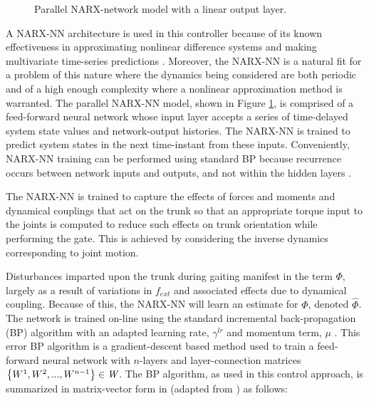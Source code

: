 		\begin{figure}[h!]
			\centering
			\caption{Parallel NARX-network model with a linear output layer.}
			\label{fig::narx_net}
		\end{figure}

		A NARX-NN architecture is used in this controller because of  its known effectiveness in approximating nonlinear difference systems and making multivariate time-series predictions \cite{Tsungnan1996,ChenBillings1990,Hihi1996,Billings2013}. Moreover, the NARX-NN is a natural fit for a problem of this nature where the dynamics being considered are both periodic and of a high enough complexity where a nonlinear approximation method is warranted. The parallel NARX-NN model, shown in Figure \ref{fig::narx_net}, is comprised of a feed-forward neural network whose input layer accepts a series of time-delayed system state values and network-output histories. The NARX-NN is trained to predict system states in the next time-instant from these inputs. Conveniently, NARX-NN training can be performed using standard BP because recurrence occurs between network inputs and outputs, and not within the hidden layers \cite{Nelles2001}.

		The NARX-NN is trained to capture the effects of forces and moments and dynamical couplings that act on the trunk so that an appropriate torque input to the joints is computed to reduce such effects on trunk orientation while performing the gate. This is achieved by considering the inverse dynamics corresponding to joint motion.

		Disturbances imparted upon the trunk during gaiting manifest in the term $\Phi$, largely as a result of variations in $f_{ext}$ and associated effects due to dynamical coupling. Because of this, the NARX-NN will learn an estimate for $\Phi$, denoted $\hat{\Phi}$. The network is trained on-line using the standard incremental back-propagation (BP) algorithm with an adapted learning rate, $\gamma^{lr}$ and momentum term, $\mu$ \cite{Rumelhart1988,Rumelhart1995}. This error BP algorithm is a gradient-descent based method used to train a feed-forward neural network with $n$-layers and layer-connection matrices $\left\{W^{1},W^{2},...,W^{n-1}\right\} \in \emph{W}$. The BP algorithm, as used in this control approach, is summarized in matrix-vector form in (adapted from \cite{Rojas1996ch7}) as follows: 

